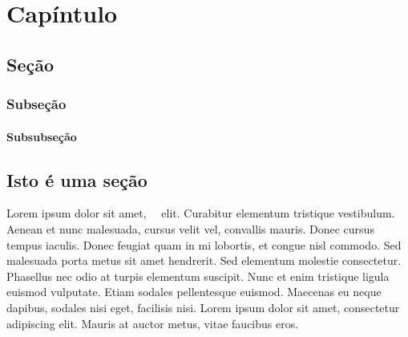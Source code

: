\chapter{Capíntulo}
\section{Seção}
\subsection{Subseção}
\subsubsection{Subsubseção}

\section{Isto é uma seção}
Lorem ipsum dolor sit amet,\ \  elit. Curabitur elementum tristique vestibulum. Aenean et nunc malesuada, cursus velit vel, convallis mauris. Donec cursus tempus iaculis. Donec feugiat quam in mi lobortis, et congue nisl commodo. Sed malesuada porta metus sit amet hendrerit. Sed elementum molestie consectetur. Phasellus nec odio at turpis elementum suscipit. Nunc et enim tristique ligula euismod vulputate. Etiam sodales pellentesque euismod. Maecenas eu neque dapibus, sodales nisi eget, facilisis nisi. Lorem ipsum dolor sit amet, consectetur adipiscing elit. Mauris at auctor metus, vitae faucibus eros.
